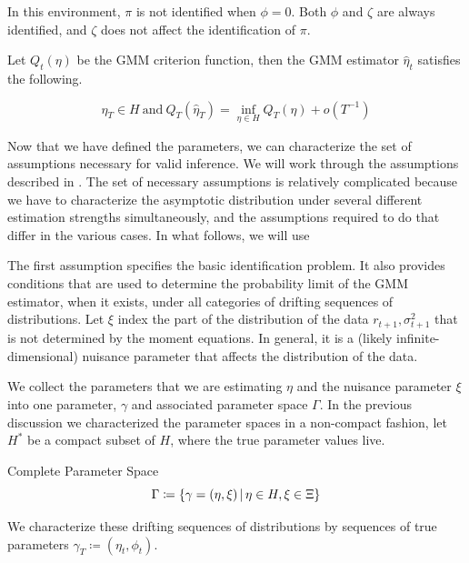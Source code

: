 \documentclass[11pt]{article}
\newcommand*{\Eta}{H}
\newcommand{\mvert}[1][\middle]{\ensuremath{\,#1\vert\,}}
\begin{document}
In this environment, $\pi$ is not identified when $\phi = 0$.
Both $\phi$ and $\zeta$ are always identified, and $\zeta$ does not affect the identification of $\pi$.

Let $Q_t(\eta)$ be the GMM criterion function, then the GMM estimator $\hat{\eta}_t$ satisfies the following.


\begin{equation}
    \hat{\eta}_T \in \Eta\ \text{and}\ Q_T(\hat{\eta}_T) = \inf_{\eta \in \Eta} Q_T(\eta) +
    o\left(T^{-1}\right) 
\end{equation}


Now that we have defined the parameters, we can characterize the set of assumptions necessary for valid inference.
We will work through the assumptions described in \textcite{andrewsGmm2014}.
The set of necessary assumptions is relatively complicated because we have to characterize the asymptotic
distribution under several different estimation strengths simultaneously, and the assumptions required to do that
  differ in the various cases. 
In what follows, we will use 

The first assumption specifies the basic identification
problem. It also provides conditions that are used to determine the
probability limit of the GMM estimator, when it exists, under all categories
of drifting sequences of distributions.
Let $\xi$ index the part of the distribution of the data $r_{t+1}, \sigma^2_{t+1}$ that is not determined by the
moment equations.
In general, it is a (likely infinite-dimensional) nuisance parameter that affects the distribution of the data. 


We collect the parameters that we are estimating $\eta$ and the nuisance parameter $\xi$ into one parameter,
$\gamma$ and associated parameter space $\Gamma$.
In the previous discussion we characterized the parameter spaces in a non-compact fashion, let $\Eta^{*}$ be a
compact subset of $\Eta$, where the true parameter values live.

\begin{defn}{Complete Parameter Space}
    \begin{equation}
        \Gamma \coloneqq \left\lbrace \gamma = (\eta, \xi) \mvert \eta \in \Eta, \xi \in \Xi \right\rbrace 
    \end{equation}
\end{defn}

We characterize these drifting sequences of distributions by sequences of true parameters $\gamma_T \coloneqq
(\eta_t, \phi_t)$.
\end{document}

